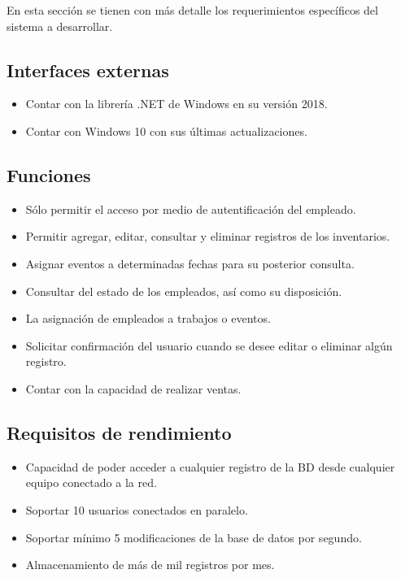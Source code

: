 En esta sección se tienen con más detalle los requerimientos específicos del sistema a desarrollar.

\subsection{Interfaces externas}
\begin{itemize}
\item Contar con la librería .NET de Windows en su versión 2018.
\item Contar con Windows 10 con sus últimas actualizaciones.
\end{itemize}

\subsection{Funciones}
\begin{itemize}
\item Sólo permitir el acceso por medio de autentificación del empleado.
\item Permitir agregar, editar, consultar y eliminar registros de los inventarios.
\item Asignar eventos a determinadas fechas para su posterior consulta.
\item Consultar del estado de los empleados, así como su disposición.
\item La asignación de empleados a trabajos o eventos.
\item Solicitar confirmación del usuario cuando se desee editar o eliminar algún registro.
\item Contar con la capacidad de realizar ventas.
\end{itemize}

\subsection{Requisitos de rendimiento}
\begin{itemize}
\item Capacidad de poder acceder a cualquier registro de la BD desde cualquier equipo conectado a la red.
\item Soportar 10 usuarios conectados en paralelo.
\item Soportar mínimo 5 modificaciones de la base de datos por segundo.
\item Almacenamiento de más de mil registros por mes.
\end{itemize}

